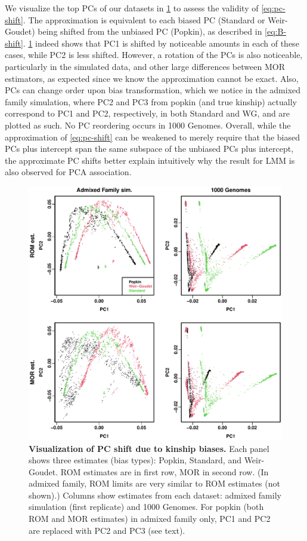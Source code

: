 \documentclass[11pt]{article}
\begin{document}
\begin{linenumbers}
We visualize the top PCs of our datasets in \cref{fig:pcs} to assess the validity of \cref{eq:pc-shift}.
The approximation is equivalent to each biased PC (Standard or Weir-Goudet) being shifted from the unbiased PC (Popkin), as described in \cref{eq:B-shift}.
\cref{fig:pcs} indeed shows that PC1 is shifted by noticeable amounts in each of these cases, while PC2 is less shifted.
However, a rotation of the PCs is also noticeable, particularly in the simulated data, and other large differences between MOR estimators, as expected since we know the approximation cannot be exact.
Also, PCs can change order upon bias transformation, which we notice in the admixed family simulation, where PC2 and PC3 from popkin (and true kinship) actually correspond to PC1 and PC2, respectively, in both Standard and WG, and are plotted as such.
No PC reordering occurs in 1000 Genomes.
Overall, while the approximation of \cref{eq:pc-shift} can be weakened to merely require that the biased PCs plus intercept span the same subspace of the unbiased PCs plus intercept, the approximate PC shifts better explain intuitively why the result for LMM is also observed for PCA association.

\begin{figure}[bp!]
  \centering
  \includegraphics[width=\textwidth]{pcs.pdf}
  \caption{
    {\bf Visualization of PC shift due to kinship biases.}
    Each panel shows three estimates (bias types): Popkin, Standard, and Weir-Goudet.
    ROM estimates are in first row, MOR in second row.
    (In admixed family, ROM limits are very similar to ROM estimates (not shown).)
    Columns show estimates from each dataset: admixed family simulation (first replicate) and 1000 Genomes.
    For popkin (both ROM and MOR estimates) in admixed family only, PC1 and PC2 are replaced with PC2 and PC3 (see text).
  }
  \label{fig:pcs}
\end{figure}


\end{linenumbers}
\end{document}
